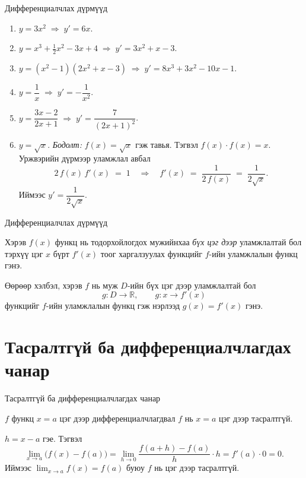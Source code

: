 \begin{frame}[allowframebreaks]{Дифференциалчлах дүрмүүд}
\begin{example}
\begin{enumerate}
  \item $y=3x^2 \;\Rightarrow\; y'=6x$.
  \item $y=x^3+\tfrac12x^2-3x+4 \;\Rightarrow\; y'=3x^2+x-3$.
  \item $y=(x^2-1)(2x^2+x-3) \;\Rightarrow\; y'=8x^3+3x^2-10x-1$.
  \item $y=\dfrac{1}{x} \;\Rightarrow\; y'= -\dfrac{1}{x^{2}}$.
  \item $y=\dfrac{3x-2}{2x+1} \;\Rightarrow\; y'=\dfrac{7}{(2x+1)^2}$.
  \item $y=\sqrt{x}$. \textit{Бодолт:} $f(x)=\sqrt{x}$ гэж тавья. Тэгвэл
        $f(x)\cdot f(x)=x$. Уржвэрийн дүрмээр уламжлал авбал
        \[
           2\,f(x)\,f'(x) \;=\; 1
           \quad\Longrightarrow\quad
           f'(x) \;=\; \frac{1}{2\,f(x)} \;=\; \frac{1}{2\sqrt{x}}.
        \]
        Иймээс $y'=\dfrac{1}{2\sqrt{x}}$.
\end{enumerate}
\end{example}
\end{frame}

\begin{frame}[allowframebreaks]{Дифференциалчлах дүрмүүд}
\begin{definition}
Хэрэв $f(x)$ функц нь тодорхойлогдох мужийнхаа \emph{бүх цэг дээр} уламжлалтай бол 
тэрхүү цэг $x$ бүрт $f'(x)$ тоог харгалзуулах функцийг $f$-ийн уламжлалын функц гэнэ.  

Өөрөөр хэлбэл, хэрэв $f$ нь муж $D$-ийн бүх цэг дээр уламжлалтай бол  
\[
g:D\to\mathbb{R}, \qquad g: x\to f'(x)
\]
функцийг $f$-ийн уламжлалын функц гэж нэрлээд $g(x)=f'(x)$ гэнэ.
\end{definition}
\end{frame}

\section{Тасралтгүй ба дифференциалчлагдах чанар}
\begin{frame}[allowframebreaks]{Тасралтгүй ба дифференциалчлагдах чанар}
\begin{theorem}
$f$ функц $x=a$ цэг дээр дифференциалчлагдвал $f$ нь $x=a$ цэг дээр тасралтгүй.
\end{theorem}

\begin{prof}
$h=x-a$ гэе. Тэгвэл
\[
\lim_{x\to a} \big(f(x)-f(a)\big)=\lim_{h\to 0}\frac{f(a+h)-f(a)}{h}\cdot h
= f'(a)\cdot 0=0.
\]
Иймээс $\displaystyle \lim_{x\to a}f(x)=f(a)$ буюу $f$ нь цэг дээр тасралтгүй.
\end{prof}
\end{frame}

